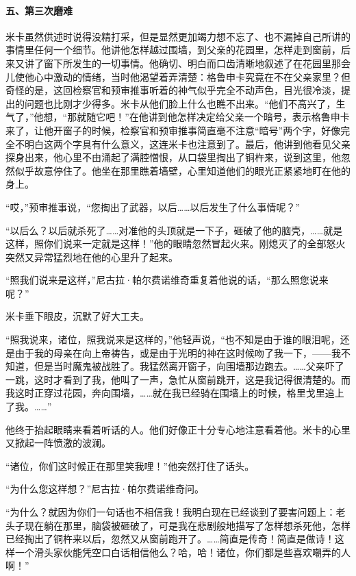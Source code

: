 \paragraph*{五、第三次磨难}
\par 米卡虽然供述时说得没精打采，但是显然更加竭力想不忘了、也不漏掉自己所讲的事情里任何一个细节。他讲他怎样越过围墙，到父亲的花园里，怎样走到窗前，后来又讲了窗下所发生的一切事情。他确切、明白而口齿清晰地叙述了在花园里那会儿使他心中激动的情绪，当时他渴望着弄清楚：格鲁申卡究竟在不在父亲家里？但奇怪的是，这回检察官和预审推事听着的神气似乎完全不动声色，目光很冷淡，提出的问题也比刚才少得多。米卡从他们脸上什么也瞧不出来。“他们不高兴了，生气了，”他想，“那就随它吧！”在他讲到他怎样决定给父亲一个暗号，表示格鲁申卡来了，让他开窗子的时候，检察官和预审推事简直毫不注意“暗号”两个字，好像完全不明白这两个字具有什么意义，这连米卡也注意到了。最后，他讲到他看见父亲探身出来，他心里不由涌起了满腔憎恨，从口袋里掏出了铜杵来，说到这里，他忽然似乎故意停住了。他坐在那里瞧着墙壁，心里知道他们的眼光正紧紧地盯在他的身上。
\par “哎，”预审推事说，“您掏出了武器，以后……以后发生了什么事情呢？”
\par “以后么？以后就杀死了……对准他的头顶就是一下子，砸破了他的脑壳，……就是这样，照你们说来一定就是这样！”他的眼睛忽然冒起火来。刚熄灭了的全部怒火突然又异常猛烈地在他的心里升了起来。
\par “照我们说来是这样，”尼古拉·帕尔费诺维奇重复着他说的话，“那么照您说来呢？”
\par 米卡垂下眼皮，沉默了好大工夫。
\par “照我说来，诸位，照我说来是这样的，”他轻声说，“也不知是由于谁的眼泪呢，还是由于我的母亲在向上帝祷告，或是由于光明的神在这时候吻了我一下，——我不知道，但是当时魔鬼被战胜了。我猛然离开窗子，向围墙那边跑去。……父亲吓了一跳，这时才看到了我，他叫了一声，急忙从窗前跳开，这是我记得很清楚的。而我这时正穿过花园，奔向围墙，……就在我已经骑在围墙上的时候，格里戈里追上了我。……”
\par 他终于抬起眼睛来看着听话的人。他们好像正十分专心地注意看着他。米卡的心里又掀起一阵愤激的波澜。
\par “诸位，你们这时候正在那里笑我哩！”他突然打住了话头。
\par “为什么您这样想？”尼古拉·帕尔费诺维奇问。
\par “为什么？就因为你们一句话也不相信我！我明白现在已经谈到了要害问题上：老头子现在躺在那里，脑袋被砸破了，可是我在悲剧般地描写了怎样想杀死他，怎样已经掏出了铜杵来以后，忽然又从窗前跑开了。……简直是传奇！简直是做诗！这样一个滑头家伙能凭空口白话相信他么？哈，哈！诸位，你们都是些喜欢嘲弄的人啊！”
